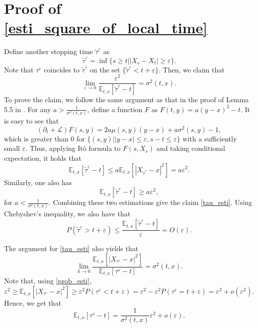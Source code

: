 \documentclass[11pt]{article}
\begin{document}
\section{Proof of \eqref{esti_square_of_local_time}} \label{append_esti}
Define another stopping time $\tilde \tau^{\varepsilon}$ as 
$$
\tilde \tau^{\varepsilon}=\inf \{s\ge t||X_s-X_t|\ge \varepsilon\}.
$$
Note that $\tau^{\varepsilon} $ coincides to $\tilde \tau^{\varepsilon}$ on the set $\{\tilde \tau^{\varepsilon}<t+\varepsilon\}$. Then, we claim that 
\begin{equation}\label{tau_esti}
  \lim_{\varepsilon\rightarrow 0}\frac{\varepsilon^2}{\mathbb E_{t,x}[\tilde \tau^{\varepsilon}-t]}=\sigma^2(t,x).  
\end{equation}
To prove the claim, we follow the same argument as that in the proof of Lemma 5.5 in \cite{christensen2020time}. For any $a>\frac{1}{\sigma^2(t,x)}$, define a function $F$ as $F(t,y)=a(y-x)^2-t$. It is easy to see that 
$$
(\partial_t+\mathcal L)F(s,y)=2a\mu(s,y)(y-x)+a\sigma^2(s,y)-1,
$$
which is  greater than $0$ for $\{(s,y)||y-x|\le \varepsilon,s-t\le \varepsilon\}$ with a sufficiently small $\varepsilon$. Thus, applying It\^o formula to $F(s,X_s)$ and taking conditional expectation, it holds that 
$$\mathbb E_{t,x}[\tilde \tau^{\varepsilon}-t] \le a \mathbb E_{t,x}[|X_{\tilde \tau^{\varepsilon}}-x|^2]=a\varepsilon^2.$$
Similarly, one also has 
$$\mathbb E_{t,x}[\tilde \tau^{\varepsilon}-t] \ge a\varepsilon^2,$$
for $a<\frac{1}{\sigma^2(t,x)}$. Combining these two estimations  give the claim \eqref{tau_esti}.
Using Chebyshev's inequality, we also have that 
\begin{equation}\label{prob_esti}
    P(\tilde \tau^{\varepsilon}>t+\varepsilon) \le \frac{\mathbb E_{t,x}[\tilde \tau^{\varepsilon}-t]}{\varepsilon}=O(\varepsilon).
\end{equation}

The argument for \eqref{tau_esti} also yields that 
$$ \lim _{h\rightarrow 0}\frac{\mathbb E_{t,x}[|X_{\tau^{\varepsilon}}-x|^2]}{\mathbb E_{t,x}[\tau^{\varepsilon}-t]}=\sigma^2(t,x).
$$
Note that, using \eqref{prob_esti}, 
$$
\varepsilon^2\ge\mathbb E_{t,x}[|X_{\tau^{\varepsilon}}-x|^2]\ge \varepsilon^2P(\tau^{\varepsilon}<t+\varepsilon)=\varepsilon^2-\varepsilon^2P(\tau^{\varepsilon}=t+\varepsilon)=\varepsilon^2+o(\varepsilon^2).
$$
Hence, we get that 
\begin{equation}\label{est1}
 \mathbb E_{t,x}[\tau^{\varepsilon}-t]=\frac{1}{\sigma^2(t,x)}\varepsilon^2+o(\varepsilon).   
\end{equation}
\end{document}
